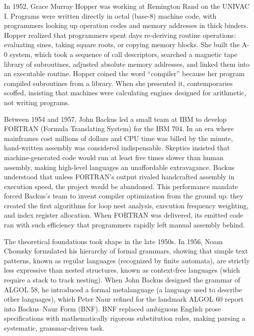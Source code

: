 \begin{historybox}
In 1952, Grace Murray Hopper was working at Remington Rand on the UNIVAC I.
Programs were written directly in octal (base-8) machine code, with programmers looking
up operation codes and memory addresses in thick binders. Hopper realized that
programmers spent days re-deriving routine operations: evaluating sines, taking
square roots, or copying memory blocks. She built the A-0 system, which took a
sequence of call descriptors, searched a magnetic tape library of subroutines,
adjusted absolute memory addresses, and linked them into an executable routine. Hopper
coined the word ``compiler'' because her program compiled subroutines from a
library. When she presented it, contemporaries scoffed, insisting that machines
were calculating engines designed for arithmetic, not writing programs.

Between 1954 and 1957, John Backus led a small team at IBM to develop FORTRAN
(Formula Translating System) for the IBM 704. In an era where mainframes cost
millions of dollars and CPU time was billed by the minute, hand-written assembly
was considered indispensable. Skeptics insisted that machine-generated
code would run at least five times slower than human assembly, making high-level
languages an unaffordable extravagance. Backus understood that unless FORTRAN's
output rivaled handcrafted assembly in execution speed, the project would be
abandoned. This performance mandate forced Backus's team to invent compiler
optimization from the ground up: they created the first algorithms for loop
nest analysis, execution frequency weighting, and index register allocation.
When FORTRAN was delivered, its emitted code ran with such efficiency that
programmers rapidly left manual assembly behind.

The theoretical foundations took shape in the late 1950s. In 1956, Noam Chomsky
formulated his hierarchy of formal grammars, showing that simple text patterns, known as regular languages
(recognized by finite automata), are strictly less expressive than nested structures, known as context-free
languages (which require a stack to track nesting). When John Backus designed the grammar of
ALGOL 58, he introduced a formal metalanguage (a language used to describe other languages), which Peter Naur refined for the
landmark ALGOL 60 report into Backus--Naur Form (BNF). BNF replaced ambiguous
English prose specifications with mathematically rigorous substitution rules,
making parsing a systematic, grammar-driven task.


\end{historybox}
